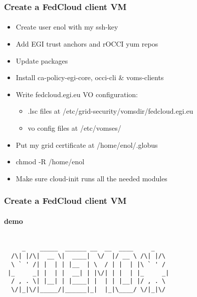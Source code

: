 
\begin{frame}
  \frametitle{Create a FedCloud client VM}
  \framesubtitle{}

  \begin{itemize}
    \item Create user enol with my ssh-key
    \item Add EGI trust anchors and rOCCI yum repos
    \item Update packages
    \item Install ca-policy-egi-core, occi-cli \& voms-clients
    \item Write fedcloud.egi.eu VO configuration:
    \begin{itemize}
        \item .lsc files at /etc/grid-security/vomsdir/fedcloud.egi.eu
        \item vo config files at /etc/vomses/
    \end{itemize}
    \item Put my grid certificate at /home/enol/.globus
    \item chmod -R /home/enol
    \item Make sure cloud-init runs all the needed modules
  \end{itemize}

\end{frame}


\begin{frame}[fragile]
  \frametitle{Create a FedCloud client VM}
  \framesubtitle{demo}

  \begin{Sbox}
  \begin{minipage}{\linewidth-2\fboxsep-2\fboxrule-4pt}
  \color{white}
  \begin{verbatim}

     _    _____  ______ __  __  ____     _    
  /\| |/\|  __ \|  ____|  \/  |/ __ \ /\| |/\ 
  \ ` ' /| |  | | |__  | \  / | |  | |\ ` ' / 
 |_     _| |  | |  __| | |\/| | |  | |_     _|
  / , . \| |__| | |____| |  | | |__| |/ , . \ 
  \/|_|\/|_____/|______|_|  |_|\____/ \/|_|\/ 
  \end{verbatim}
  \end{minipage}
  \end{Sbox}

\end{frame}


